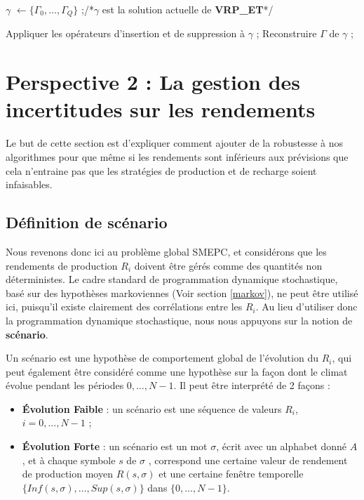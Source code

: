{\begin{algorithm}
\begin{algorithmic}[1]
			\INITIALISATION
			\STATE  $\gamma $ $\leftarrow \{ \Gamma_0, \dots, \Gamma_Q\}$ ;/*$\gamma $ est la solution actuelle de \textbf{VRP\_ET}*/
			
			\vspace{0.3cm}
			
			\BOUCLEPRINCIPAL
			\STATE Appliquer les opérateurs d'insertion et de suppression à  $\gamma$ ;
			\ENDWHILE
			\STATE Reconstruire $\Gamma$ de $\gamma$ ;
		\end{algorithmic}
	\end{algorithm}
	
\section{Perspective 2 : La gestion des incertitudes sur les rendements }
Le but de cette section est d'expliquer comment ajouter de la robustesse à nos algorithmes pour que même si les rendements sont inférieurs aux prévisions que cela n'entraine pas que les stratégies de production et de recharge soient infaisables.
\subsection{Définition de scénario}

Nous revenons donc ici au problème global SMEPC, et considérons que les rendements de production $R_i$ doivent être gérés comme des quantités non déterministes. Le cadre standard de programmation dynamique stochastique, basé sur des hypothèses markoviennes (Voir section \ref{markov}), ne peut être utilisé ici, puisqu'il existe clairement des corrélations entre les $R_i$. Au lieu d'utiliser donc la programmation dynamique stochastique, nous nous appuyons sur la notion de \textbf{scénario}. 

Un scénario est une hypothèse de comportement global de l'évolution du $R_i$, qui peut également être considéré comme une hypothèse sur la façon dont le climat évolue pendant les périodes $0, \dots, N-1$. Il peut être interprété de 2 façons :

\begin{itemize}[label=$\square$]	
\item \textbf{Évolution Faible} : un scénario est une séquence de valeurs $R_i$, $i = 0, \dots, N-1$ ;
\item \textbf{Évolution Forte} : un scénario est un mot $\sigma$, écrit avec un alphabet donné $A$ , et à chaque symbole $s$ de $\sigma$ , correspond une certaine valeur de rendement de production moyen $R(s,\sigma )$ et une certaine fenêtre temporelle $\{Inf(s, \sigma), \dots, Sup(s,\sigma )\}$ dans $\{0, \dots, N-1\}$.
\end{itemize}

}
